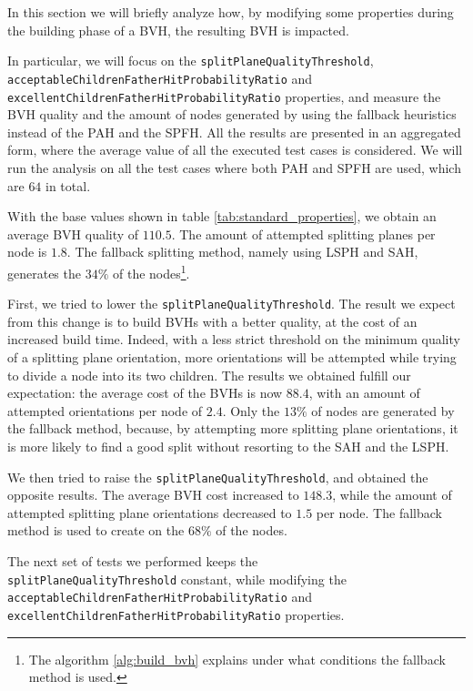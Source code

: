 \documentclass[acmtog, anonymous, review]{acmart}
\begin{document}
In this section we will briefly analyze how, by modifying some properties during the building phase of a BVH, the resulting BVH is impacted. 

In particular, we will focus on the \texttt{splitPlaneQualityThreshold}, \\\texttt{acceptableChildrenFatherHitProbabilityRatio} and \\\texttt{excellentChildrenFatherHitProbabilityRatio} properties, and measure the BVH quality and the amount of nodes generated by using the fallback heuristics instead of the PAH and the SPFH. All the results are presented in an aggregated form, where the average value of all the executed test cases is considered. We will run the analysis on all the test cases where both PAH and SPFH are used, which are $64$ in total.

With the base values shown in table \ref{tab:standard_properties}, we obtain an average BVH quality of $110.5$. The amount of attempted splitting planes per node is $1.8$. The fallback splitting method, namely using LSPH and SAH, generates the $34\%$ of the nodes\footnote{The algorithm \ref{alg:build_bvh} explains under what conditions the fallback method is used.}.

First, we tried to lower the \texttt{splitPlaneQualityThreshold}. The result we expect from this change is to build BVHs with a better quality, at the cost of an increased build time. Indeed, with a less strict threshold on the minimum quality of a splitting plane orientation, more orientations will be attempted while trying to divide a node into its two children. The results we obtained fulfill our expectation: the average cost of the BVHs is now $88.4$, with an amount of attempted orientations per node of $2.4$. Only the $13\%$ of nodes are generated by the fallback method, because, by attempting more splitting plane orientations, it is more likely to find a good split without resorting to the SAH and the LSPH.

We then tried to raise the \texttt{splitPlaneQualityThreshold}, and obtained the opposite results. The average BVH cost increased to $148.3$, while the amount of attempted splitting plane orientations decreased to $1.5$ per node. The fallback method is used to create on the $68\%$ of the nodes.

The next set of tests we performed keeps the \\\texttt{splitPlaneQualityThreshold} constant, while modifying the \\\texttt{acceptableChildrenFatherHitProbabilityRatio} and \\\texttt{excellentChildrenFatherHitProbabilityRatio} properties.
\end{document}
